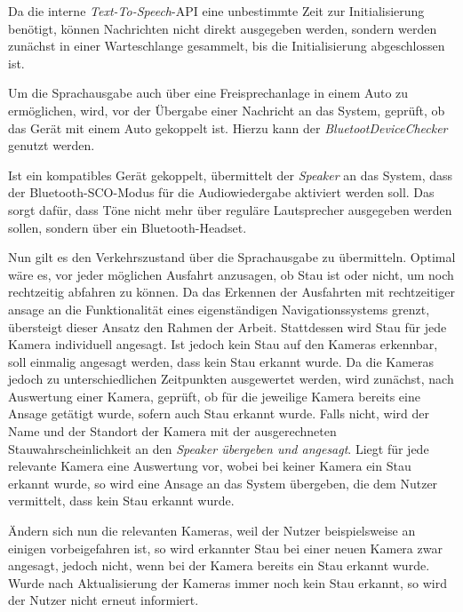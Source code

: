 Da die interne {\em Text-To-Speech}-API eine unbestimmte Zeit zur Initialisierung benötigt, können Nachrichten nicht direkt ausgegeben werden, sondern werden zunächst in einer Warteschlange gesammelt, bis die Initialisierung abgeschlossen ist.

Um die Sprachausgabe auch über eine Freisprechanlage in einem Auto zu ermöglichen, wird, vor der Übergabe einer Nachricht an das System, geprüft, ob das Gerät mit einem Auto gekoppelt ist. Hierzu kann der {\em BluetootDeviceChecker} genutzt werden.

Ist ein kompatibles Gerät gekoppelt, übermittelt der {\em Speaker} an das System, dass der Bluetooth-SCO-Modus für die Audiowiedergabe aktiviert werden soll. Das sorgt dafür, dass Töne nicht mehr über reguläre Lautsprecher ausgegeben werden sollen, sondern über ein Bluetooth-Headset.

Nun gilt es den Verkehrszustand über die Sprachausgabe zu übermitteln.
Optimal wäre es, vor jeder möglichen Ausfahrt anzusagen, ob Stau ist oder nicht, um noch rechtzeitig abfahren zu können.
Da das Erkennen der Ausfahrten mit rechtzeitiger ansage an die Funktionalität eines eigenständigen Navigationssystems grenzt, übersteigt dieser Ansatz den Rahmen der Arbeit.
Stattdessen wird Stau für jede Kamera individuell angesagt.
Ist jedoch kein Stau auf den Kameras erkennbar, soll einmalig angesagt werden, dass kein Stau erkannt wurde.
Da die Kameras jedoch zu unterschiedlichen Zeitpunkten ausgewertet werden, wird zunächst, nach Auswertung einer Kamera, geprüft, ob für die jeweilige Kamera bereits eine Ansage getätigt wurde, sofern auch Stau erkannt wurde. Falls nicht, wird der Name und der Standort der Kamera mit der ausgerechneten Stauwahrscheinlichkeit an den {\em Speaker übergeben und angesagt}. Liegt für jede relevante Kamera eine Auswertung vor, wobei bei keiner Kamera ein Stau erkannt wurde, so wird eine Ansage an das System übergeben, die dem Nutzer vermittelt, dass kein Stau erkannt wurde.

Ändern sich nun die relevanten Kameras, weil der Nutzer beispielsweise an einigen vorbeigefahren ist, so wird erkannter Stau bei einer neuen Kamera zwar angesagt, jedoch nicht, wenn bei der Kamera bereits ein Stau erkannt wurde. Wurde nach Aktualisierung der Kameras immer noch kein Stau erkannt, so wird der Nutzer nicht erneut informiert.